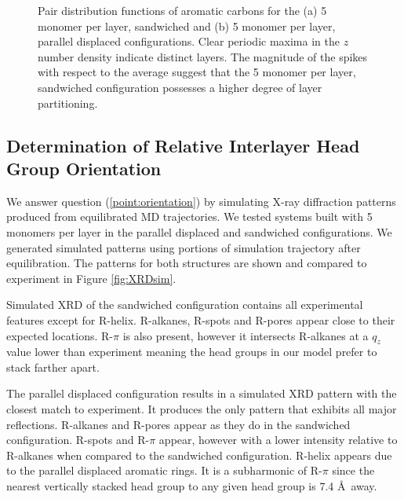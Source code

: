 \documentclass{article}
\begin{document}
\begin{figure}
\begin{subfigure}{0.45\textwidth}
                \caption{}\label{fig:zdf_offset}
        \end{subfigure}
        \caption{Pair distribution functions of aromatic carbons for the
        (a) 5 monomer per layer, sandwiched and (b) 5 monomer per layer,
        parallel displaced configurations. Clear periodic maxima in the
        $z$ number density indicate distinct layers. The magnitude
        of the spikes with respect to the average suggest that the 5
        monomer per layer, sandwiched configuration possesses a higher
        degree of layer partitioning.}\label{fig:zdf}
  \end{figure}

  \subsection{Determination of Relative Interlayer Head Group Orientation}

  We answer question (\ref{point:orientation}) by simulating X-ray diffraction
  patterns produced from equilibrated MD trajectories. We tested systems built
  with 5 monomers per layer in the parallel displaced and sandwiched
  configurations. We generated simulated patterns using portions of simulation
  trajectory after equilibration. The patterns for both structures are shown and
  compared to experiment in Figure \ref{fig:XRDsim}.

  Simulated XRD of the sandwiched configuration contains all experimental
  features except for R-helix. R-alkanes, R-spots and R-pores appear close to their
  expected locations. R-$\pi$ is also present, however it intersects R-alkanes at
  a $q_z$ value lower than experiment meaning the head groups in our model prefer 
  to stack farther apart. 

  The parallel displaced configuration results in a simulated XRD pattern with
  the closest match to experiment. It produces the only pattern that exhibits all
  major reflections. R-alkanes and R-pores appear as they do in the sandwiched
  configuration. R-spots and R-$\pi$ appear, however with a lower intensity
  relative to R-alkanes when compared to the sandwiched configuration. R-helix
  appears due to the parallel displaced aromatic rings. It is a subharmonic of
  R-$\pi$ since the nearest vertically stacked head group to any given head group
  is 7.4 \AA~away. 
\end{document}
